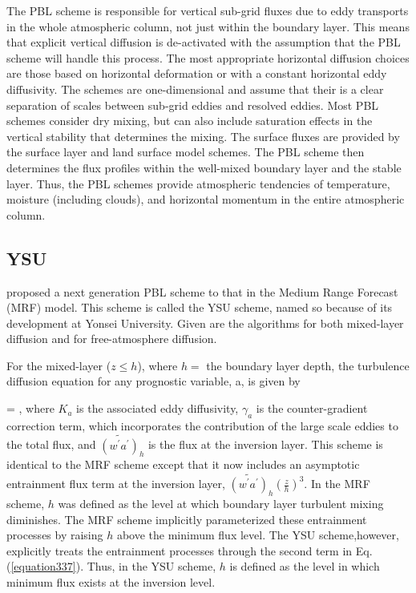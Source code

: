 The PBL scheme is responsible for vertical sub-grid fluxes due to eddy transports in the whole
atmospheric column, not just within the boundary layer. This means that explicit vertical diffusion
is de-activated with the assumption that the PBL scheme will handle this process. The most
appropriate horizontal diffusion choices are those based on horizontal deformation or with a
constant horizontal eddy diffusivity. The schemes are one-dimensional and assume that their is a
clear separation of scales between sub-grid eddies and resolved eddies. Most PBL schemes consider
dry mixing, but can also include saturation effects in the vertical stability that determines the
mixing. The surface fluxes are provided by the surface layer and land surface model schemes. The PBL scheme then determines
the flux profiles within the well-mixed boundary layer and the stable layer. Thus, the PBL schemes
provide atmospheric tendencies of temperature, moisture (including clouds), and horizontal momentum
in the entire atmospheric column.

\subsection{YSU}
\label{pbl-ysu-361}

 \citet{Hong06} proposed a next generation PBL scheme to that in the Medium Range Forecast (MRF) model. This scheme is called the YSU scheme, named so because of its development at Yonsei University. Given are the algorithms for both mixed-layer diffusion and for free-atmosphere diffusion.

For the mixed-layer ($z \leq h$), where $h=$ the boundary layer depth, the turbulence diffusion equation for any prognostic variable, a, is given by

\bea
{} = , \label{equation337}
\eea
\noindent
 where $K_a$ is the associated eddy diffusivity, $\gamma_a$ is the counter-gradient correction term, which incorporates the contribution of the large scale eddies to the total flux, and $\widetilde{(w^{\prime}a^{\prime})}_h$ is the flux at the inversion layer. This scheme is identical to the MRF scheme except that it now includes an asymptotic entrainment flux term at the inversion layer, $\widetilde{(w^{\prime}a^{\prime})}_h\left(\frac{z}{h} \right)^3$. In the MRF scheme, $h$ was defined as the level at which boundary layer turbulent mixing diminishes. The MRF scheme implicitly parameterized these entrainment processes by raising $h$ above the minimum flux level. The YSU scheme,however, explicitly treats the entrainment processes through the second term in Eq. (\autoref{equation337}). Thus, in the YSU scheme, $h$ is defined as the level in which minimum flux exists at the inversion level.

